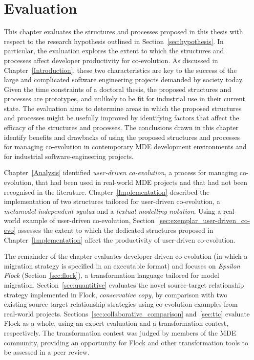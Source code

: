 
\chapter{Evaluation}
\label{Evaluation}
This chapter evaluates the structures and processes proposed in this thesis with respect to the research hypothesis outlined in Section~\ref{sec:hypothesis}. In particular, the evaluation explores the extent to which the structures and processes affect developer productivity for co-evolution. As discussed in Chapter~\ref{Introduction}, 
these two characteristics are key to the success of the large and complicated software engineering projects demanded by society today. Given the time constraints of a doctoral thesis, the proposed structures and processes are prototypes, and unlikely to be fit for industrial use in their current state. The evaluation aims to determine areas in which the proposed structures and processes might be usefully improved by identifying factors that affect the efficacy of the structures and processes. The conclusions drawn in this chapter identify benefits and drawbacks of using the proposed structures and processes for managing co-evolution in contemporary MDE development environments and for industrial software-engineering projects.

Chapter~\ref{Analysis} identified \emph{user-driven co-evolution}, a process for managing co-evolution, that had been used in real-world MDE projects and that had not been recognised in the literature. Chapter~\ref{Implementation} described the implementation of two structures tailored for user-driven co-evolution, a \emph{metamodel-independent syntax} and a \emph{textual modelling notation}. Using a real-world example of user-driven co-evolution, Section~\ref{sec:exemplar_user-driven_co-evo} assesses the extent to which the dedicated structures proposed in Chapter~\ref{Implementation} affect the productivity of user-driven co-evolution.

The remainder of the chapter evaluates developer-driven co-evolution (in which a migration strategy is specified in an executable format) and focuses on \emph{Epsilon Flock} (Section~\ref{sec:flock}), a transformation language tailored for model migration. Section~\ref{sec:quantitive} evaluates the novel source-target relationship strategy implemented in Flock, \emph{conservative copy}, by comparison with two existing source-target relationship strategies using co-evolution examples from real-world projects. Sections~\ref{sec:collaborative_comparison} and~\ref{sec:ttc} evaluate Flock as a whole, using an expert evaluation and a transformation contest, respectively. The transformation contest was judged by members of the MDE community, providing an opportunity for Flock and other transformation tools to be assessed in a peer review.

